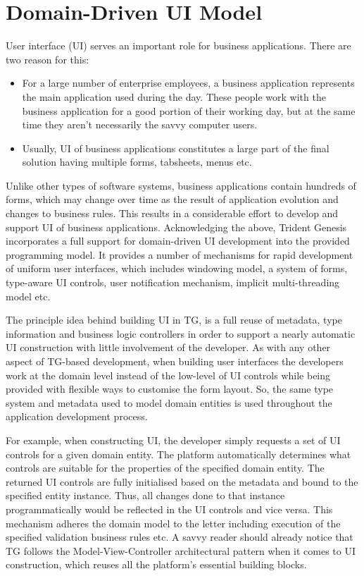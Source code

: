 \section{Domain-Driven UI Model}\label{sec:05}

  User interface (UI) serves an important role for business applications.
  There are two reason for this:
  \begin{itemize}
   \item For a large number of enterprise employees, a business application represents the main application used during the day. 
	 These people work with the business application for a good portion of their working day, but at the same time they aren't necessarily the savvy computer users.
   \item Usually, UI of business applications constitutes a large part of the final solution having multiple forms, tabsheets, menus etc.
  \end{itemize}
  Unlike other types of software systems, business applications contain hundreds of forms, which may change over time as the result of application evolution and changes to business rules.
  This results in a considerable effort to develop and support UI of business applications.
  Acknowledging the above, Trident Genesis incorporates a full support for domain-driven UI development into the provided programming model.
  It provides a number of mechanisms for rapid development of uniform user interfaces, which includes windowing model, a system of forms, type-aware UI controls, user notification mechanism, implicit multi-threading model etc.
  
  The principle idea behind building UI in TG, is a full reuse of metadata, type information and business logic controllers in order to support a nearly automatic UI construction with little involvement of the developer.
  As with any other aspect of TG-based development, when building user interfaces the developers work at the domain level instead of the low-level of UI controls while being provided with flexible ways to customise the form layout.
  So, the same type system and metadata used to model domain entities is used throughout the application development process.
  
  For example, when constructing UI, the developer simply requests a set of UI controls for a given domain entity.
  The platform automatically determines what controls are suitable for the properties of the specified domain entity.
  The returned UI controls are fully initialised based on the metadata and bound to the specified entity instance.
  Thus, all changes done to that instance programmatically would be reflected in the UI controls and vice versa.
  This mechanism adheres the domain model to the letter including execution of the specified validation business rules etc.
  A savvy reader should already notice that TG follows the Model-View-Controller architectural pattern when it comes to UI construction, which reuses all the platform's essential building blocks.


